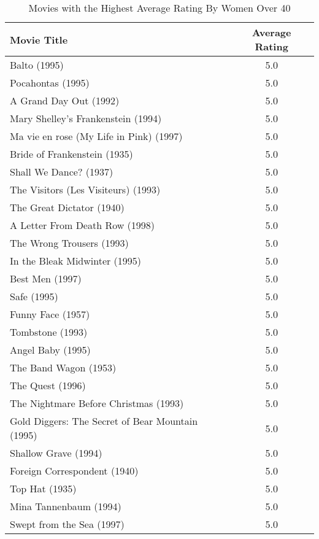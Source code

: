 \documentclass{article}
\begin{document}
\begin{table}[!h]
\centering
\begin{tabular}{l c}
Movie Title & Average Rating \\
\hline
Balto (1995) & 5.0 \\
Pocahontas (1995) & 5.0 \\
A Grand Day Out (1992) & 5.0 \\
Mary Shelley's Frankenstein (1994) & 5.0 \\
Ma vie en rose (My Life in Pink) (1997) & 5.0 \\
Bride of Frankenstein (1935) & 5.0 \\
Shall We Dance? (1937) & 5.0 \\
The Visitors (Les Visiteurs) (1993) & 5.0 \\
The Great Dictator (1940) & 5.0 \\
A Letter From Death Row (1998) & 5.0 \\
The Wrong Trousers (1993) & 5.0 \\
In the Bleak Midwinter (1995) & 5.0 \\
Best Men (1997) & 5.0 \\
Safe (1995) & 5.0 \\
Funny Face (1957) & 5.0 \\
Tombstone (1993) & 5.0 \\
Angel Baby (1995) & 5.0 \\
The Band Wagon (1953) & 5.0 \\
The Quest (1996) & 5.0 \\
The Nightmare Before Christmas (1993) & 5.0 \\
Gold Diggers: The Secret of Bear Mountain (1995) & 5.0 \\
Shallow Grave (1994) & 5.0 \\
Foreign Correspondent (1940) & 5.0 \\
Top Hat (1935) & 5.0 \\
Mina Tannenbaum (1994) & 5.0 \\
Swept from the Sea (1997) & 5.0 \\
\hline
\end{tabular}
\caption{Movies with the Highest Average Rating By Women Over 40}
\end{table}
\end{document}

